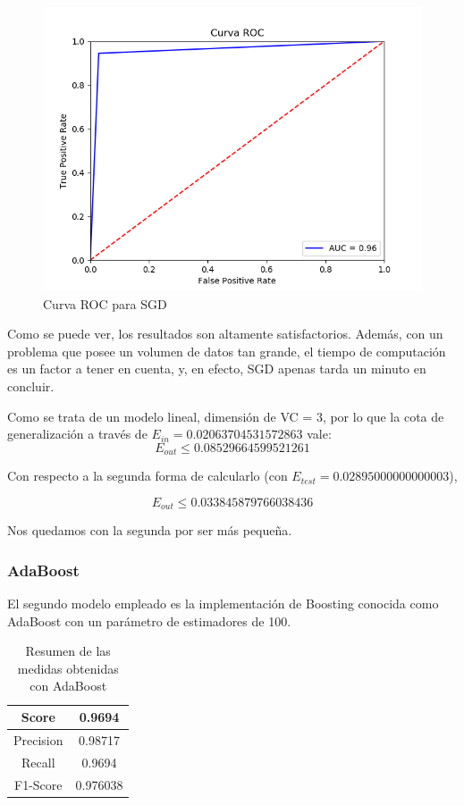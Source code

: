 \begin{figure}[H] %
	\centering
	\includegraphics[scale=0.6]{ROC-SGD.png}  %
	\caption{Curva ROC para SGD} 
	\label{fig:roc-sgd}
\end{figure}

Como se puede ver, los resultados son altamente satisfactorios. Además, con un problema que posee un volumen de datos tan grande, el tiempo de computación es un factor a tener en cuenta, y, en efecto, SGD apenas tarda un minuto en concluir. 

Como se trata de un modelo lineal, dimensión de VC = 3, por lo que la cota de generalización a través de $E_{in} = 0.02063704531572863$ vale:
$$E_{out} \leq 0.08529664599521261$$

Con respecto a la segunda forma de calcularlo (con $E_{test}=0.02895000000000003$),

$$E_{out} \leq 0.033845879766038436$$

Nos quedamos con la segunda por ser más pequeña.
\subsubsection{AdaBoost}

El segundo modelo empleado es la implementación de Boosting conocida como AdaBoost con un parámetro de estimadores de 100. 

\begin{table}[H]
	\centering
	\begin{tabular}{|c|c|}
		\hline
		Score     & 0.9694   \\ \hline
		Precision & 0.98717  \\ \hline
		Recall    & 0.9694   \\ \hline
		F1-Score  & 0.976038 \\ \hline
	\end{tabular}
	\caption{Resumen de las medidas obtenidas con AdaBoost}
\end{table}

